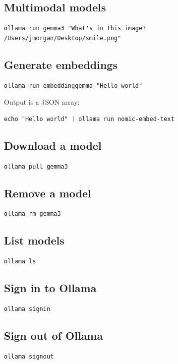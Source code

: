 \documentclass[12pt,UTF8]{ctexbook}
\begin{document}
\subsection{Multimodal models}
\begin{verbatim}
ollama run gemma3 "What's in this image? /Users/jmorgan/Desktop/smile.png"
\end{verbatim}

\subsection{Generate embeddings}
\begin{verbatim}
ollama run embeddinggemma "Hello world"
\end{verbatim}

Output is a JSON array:
\begin{verbatim}
echo "Hello world" | ollama run nomic-embed-text
\end{verbatim}

\subsection{Download a model}
\begin{verbatim}
ollama pull gemma3
\end{verbatim}

\subsection{Remove a model}
\begin{verbatim}
ollama rm gemma3
\end{verbatim}

\subsection{List models}
\begin{verbatim}
ollama ls
\end{verbatim}

\subsection{Sign in to Ollama}
\begin{verbatim}
ollama signin
\end{verbatim}

\subsection{Sign out of Ollama}
\begin{verbatim}
ollama signout
\end{verbatim}
\end{document}
